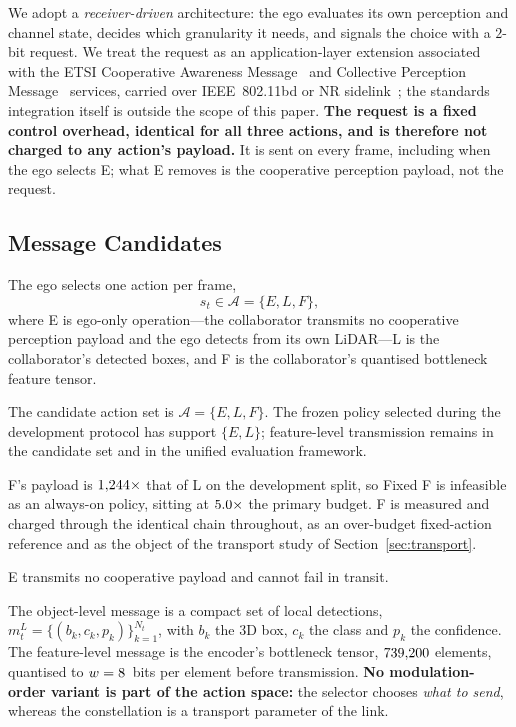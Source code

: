 \documentclass[journal]{IEEEtran}
\begin{document}
We adopt a \emph{receiver-driven} architecture: the ego evaluates its own perception and channel
state, decides which granularity it needs, and signals the choice with a $2$-bit request. We treat
the request as an application-layer extension associated with the ETSI Cooperative Awareness
Message~\cite{etsi_cam} and Collective Perception Message~\cite{etsi_cpm} services, carried over
IEEE~802.11bd or NR sidelink~\cite{ieee80211bd}; the standards integration itself is outside the
scope of this paper. \textbf{The request is a fixed control overhead, identical for all three
actions, and is therefore not charged to any action's payload.} It is sent on every frame, including
when the ego selects E; what E removes is the cooperative perception payload, not the request.

\subsection{Message Candidates}\label{sec:candidates}
The ego selects one action per frame,
\begin{equation}
s_t \in \mathcal{A} = \{E, L, F\},
\label{eq:action_set}
\end{equation}
where E is ego-only operation---the collaborator transmits no cooperative perception payload and the
ego detects from its own LiDAR---L is the collaborator's detected boxes, and F is the collaborator's
quantised bottleneck feature tensor.

The candidate action set is $\mathcal{A} = \{E, L, F\}$. The frozen policy selected during the
development protocol has support $\{E, L\}$; feature-level transmission remains in the candidate
set and in the unified evaluation framework.

F's payload is $1{,}244\times$ that of L on the development split, so Fixed F is
infeasible as an always-on policy, sitting at $5.0\times$ the primary
budget. F is measured and charged through the identical chain throughout, as an over-budget
fixed-action reference and as the object of the transport study of Section~\ref{sec:transport}.

E transmits no cooperative payload and cannot fail in transit.

The object-level message is a compact set of local detections,
$m_t^{L} = \{(b_k, c_k, p_k)\}_{k=1}^{N_t}$, with $b_k$ the 3D box, $c_k$ the class and $p_k$ the
confidence. The feature-level message is the encoder's bottleneck tensor, $739{,}200$ elements,
quantised to $w = 8$~bits per element before transmission. \textbf{No modulation-order
variant is part of the action space:} the selector chooses \emph{what to send}, whereas the
constellation is a transport parameter of the link.
\end{document}
